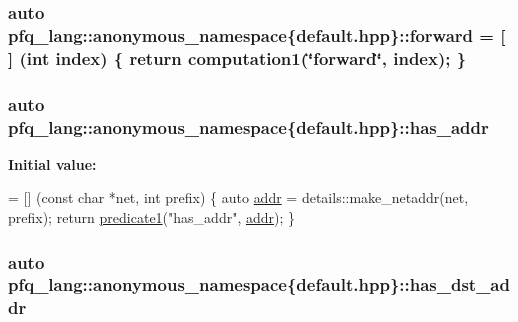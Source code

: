 \hypertarget{namespacepfq__lang_1_1anonymous__namespace_02default_8hpp_03_a7fbe4b2614dd240727bf1696b4d06523}{
\subsubsection[{forward}]{\setlength{\rightskip}{0pt plus 5cm}auto pfq\-\_\-lang\-::anonymous\-\_\-namespace\{default.\-hpp\}\-::forward = \mbox{[}$\,$\mbox{]} (int index) \{ return {\bf computation1}(\char`\"{}forward\char`\"{}, index); \}}}\label{namespacepfq__lang_1_1anonymous__namespace_02default_8hpp_03_a7fbe4b2614dd240727bf1696b4d06523}
\hypertarget{namespacepfq__lang_1_1anonymous__namespace_02default_8hpp_03_ac3ef3eefe441b183db012637b4459836}{
\subsubsection[{has\-\_\-addr}]{\setlength{\rightskip}{0pt plus 5cm}auto pfq\-\_\-lang\-::anonymous\-\_\-namespace\{default.\-hpp\}\-::has\-\_\-addr}}\label{namespacepfq__lang_1_1anonymous__namespace_02default_8hpp_03_ac3ef3eefe441b183db012637b4459836}
{\bfseries Initial value\-:}
\begin{DoxyCode}
= [] (\textcolor{keyword}{const} \textcolor{keywordtype}{char} *net, \textcolor{keywordtype}{int} prefix)
        \{
            \textcolor{keyword}{auto} \hyperlink{namespacepfq__lang_1_1anonymous__namespace_02default_8hpp_03_aafce8334d1be83bff9a2115439c8c453}{addr} = details::make\_netaddr(net, prefix);
            \textcolor{keywordflow}{return} \hyperlink{namespacepfq__lang_ae23a03cee94b5ddfde4a8d2e5c521f0e}{predicate1}(\textcolor{stringliteral}{"has\_addr"}, \hyperlink{namespacepfq__lang_1_1anonymous__namespace_02default_8hpp_03_aafce8334d1be83bff9a2115439c8c453}{addr});
        \}
\end{DoxyCode}
\hypertarget{namespacepfq__lang_1_1anonymous__namespace_02default_8hpp_03_af223a0513ceffa69c0b8535a7cca12da}{
\subsubsection[{has\-\_\-dst\-\_\-addr}]{\setlength{\rightskip}{0pt plus 5cm}auto pfq\-\_\-lang\-::anonymous\-\_\-namespace\{default.\-hpp\}\-::has\-\_\-dst\-\_\-addr}}\label{namespacepfq__lang_1_1anonymous__namespace_02default_8hpp_03_af223a0513ceffa69c0b8535a7cca12da}

